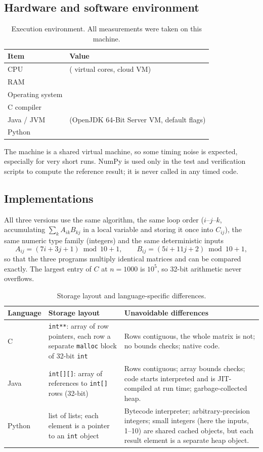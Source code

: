 \documentclass[11pt,a4paper]{article}
\begin{document}
\subsection{Hardware and software environment}
\begin{table}[H]
\centering
\begin{tabular}{lp{11cm}}
\toprule
Item & Value \\
\midrule
CPU & \EnvCPU{} (\EnvCores{} virtual cores, cloud VM) \\
RAM & \EnvRAM{} \\
Operating system & \EnvOS{} \\
C compiler & \EnvGcc{} \\
Java / JVM & \EnvJava{} (OpenJDK 64-Bit Server VM, default flags) \\
Python & \EnvPython{} \\
\bottomrule
\end{tabular}
\caption{Execution environment. All measurements were taken on this machine.}
\end{table}
The machine is a shared virtual machine, so some timing noise is expected, especially for
very short runs. NumPy is used only in the test and verification scripts to compute the reference
result; it is never called in any timed code.

\subsection{Implementations}
All three versions use the same algorithm, the same loop order ($i$--$j$--$k$,
accumulating $\sum_k A_{ik}B_{kj}$ in a local variable and storing it once into $C_{ij}$),
the same numeric type family (integers) and the same deterministic inputs
\[
  A_{ij} = (7i+3j+1) \bmod 10 + 1, \qquad B_{ij} = (5i+11j+2) \bmod 10 + 1,
\]
so that the three programs multiply identical matrices and can be compared exactly.
The largest entry of $C$ at $n=1000$ is $10^5$, so 32-bit arithmetic never overflows.

\begin{table}[H]
\centering\small
\begin{tabular}{p{1.5cm}p{4.6cm}p{6.4cm}}
\toprule
Language & Storage layout & Unavoidable differences \\
\midrule
C & \texttt{int**}: array of row pointers, each row a separate \texttt{malloc} block of 32-bit \texttt{int} & Rows contiguous, the whole matrix is not; no bounds checks; native code. \\
Java & \texttt{int[][]}: array of references to \texttt{int[]} rows (32-bit) & Rows contiguous; array bounds checks; code starts interpreted and is JIT-compiled at run time; garbage-collected heap. \\
Python & list of lists; each element is a pointer to an \texttt{int} object & Bytecode interpreter; arbitrary-precision integers; small integers (here the inputs, 1--10) are shared cached objects, but each result element is a separate heap object. \\
\bottomrule
\end{tabular}
\caption{Storage layout and language-specific differences.}
\end{table}
\end{document}
